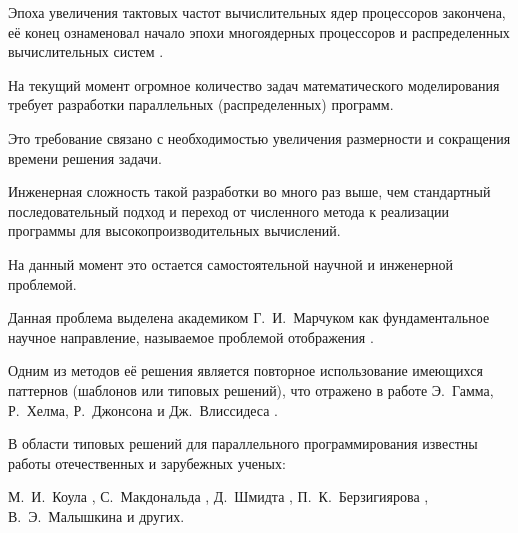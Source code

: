 




\date{18/VIII/2014}











\makerutitle










Эпоха увеличения тактовых частот вычислительных ядер процессоров закончена, её конец ознаменовал начало эпохи многоядерных процессоров и распределенных вычислительных систем \cite{Sutter2005}. 

На текущий момент огромное количество задач математического моделирования требует разработки параллельных (распределенных) программ. 

Это требование связано с необходимостью увеличения размерности и сокращения времени решения задачи. 

Инженерная сложность такой разработки во много раз выше, чем стандартный последовательный подход и переход от численного метода к реализации программы для высокопроизводительных вычислений. 

На данный момент это остается самостоятельной научной и инженерной проблемой. 

Данная проблема выделена академиком Г.~И.~Марчуком как фундаментальное научное направление, называемое проблемой отображения \cite{MarchukKotov}. 

Одним из методов её решения является повторное использование имеющихся паттернов (шаблонов или типовых решений), что отражено в работе Э.~Гамма, Р.~Хелма, Р.~Джонсона и Дж.~Влиссидеса \cite{Gamma1995Design}. 

В области типовых решений для параллельного программирования известны работы отечественных и зарубежных ученых: 

М.~И.~Коула \cite{Cole1989AlgorithmicSkeletons}, С.~Макдональда \cite{MacDonald2000Generating}, Д.~Шмидта \cite{Schmidt2001cpp1}, П.~К.~Берзигиярова \cite{Berzigiyarov}, В.~Э.~Малышкина \cite{Malishkin2001Assembly} и других. 

